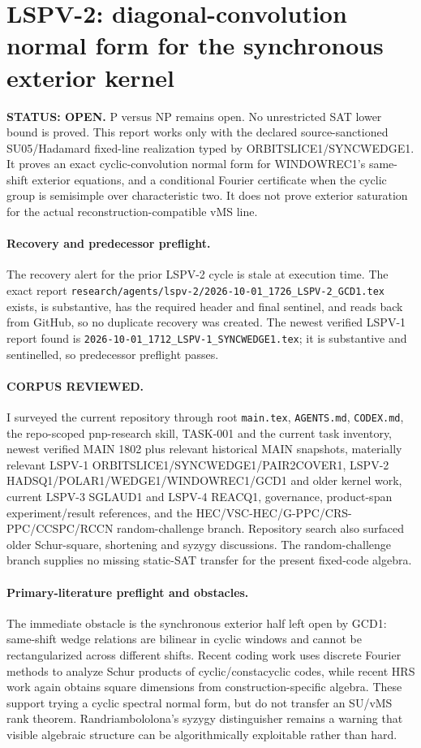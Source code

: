 \documentclass[11pt]{article}
\begin{document}
\section*{LSPV-2: diagonal-convolution normal form for the synchronous exterior kernel}

\textbf{STATUS: OPEN.} P versus NP remains open. No unrestricted SAT lower bound is proved. This report works only with the declared source-sanctioned SU05/Hadamard fixed-line realization typed by ORBITSLICE1/SYNCWEDGE1. It proves an exact cyclic-convolution normal form for WINDOWREC1's same-shift exterior equations, and a conditional Fourier certificate when the cyclic group is semisimple over characteristic two. It does not prove exterior saturation for the actual reconstruction-compatible vMS line.

\paragraph{Recovery and predecessor preflight.}
The recovery alert for the prior LSPV-2 cycle is stale at execution time. The exact report \texttt{research/agents/lspv-2/2026-10-01\_1726\_LSPV-2\_GCD1.tex} exists, is substantive, has the required header and final sentinel, and reads back from GitHub, so no duplicate recovery was created. The newest verified LSPV-1 report found is \texttt{2026-10-01\_1712\_LSPV-1\_SYNCWEDGE1.tex}; it is substantive and sentinelled, so predecessor preflight passes.

\paragraph{CORPUS REVIEWED.}
I surveyed the current repository through root \texttt{main.tex}, \texttt{AGENTS.md}, \texttt{CODEX.md}, the repo-scoped pnp-research skill, TASK-001 and the current task inventory, newest verified MAIN 1802 plus relevant historical MAIN snapshots, materially relevant LSPV-1 ORBITSLICE1/SYNCWEDGE1/PAIR2COVER1, LSPV-2 HADSQ1/POLAR1/WEDGE1/WINDOWREC1/GCD1 and older kernel work, current LSPV-3 SGLAUD1 and LSPV-4 REACQ1, governance, product-span experiment/result references, and the HEC/VSC-HEC/G-PPC/CRS-PPC/CCSPC/RCCN random-challenge branch. Repository search also surfaced older Schur-square, shortening and syzygy discussions. The random-challenge branch supplies no missing static-SAT transfer for the present fixed-code algebra.

\paragraph{Primary-literature preflight and obstacles.}
The immediate obstacle is the synchronous exterior half left open by GCD1: same-shift wedge relations are bilinear in cyclic windows and cannot be rectangularized across different shifts. Recent coding work uses discrete Fourier methods to analyze Schur products of cyclic/constacyclic codes, while recent HRS work again obtains square dimensions from construction-specific algebra. These support trying a cyclic spectral normal form, but do not transfer an SU/vMS rank theorem. Randriambololona's syzygy distinguisher remains a warning that visible algebraic structure can be algorithmically exploitable rather than hard.
\end{document}
